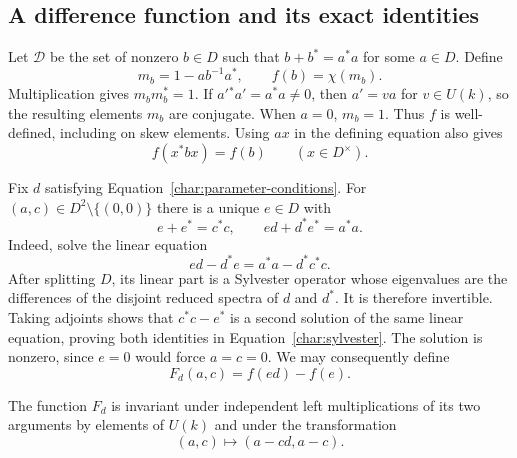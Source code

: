 \subsection{A difference function and its exact identities}

Let $\mathcal D$ be the set of nonzero $b\in D$ such that
$b+b^*=a^*a$ for some $a\in D$. Define
\begin{equation}\label{char:f}
 m_b=1-ab^{-1}a^*,\qquad f(b)=\chi(m_b).
\end{equation}
Multiplication gives $m_bm_b^*=1$. If $a'{}^*a'=a^*a\ne0$, then
$a'=va$ for $v\in U(k)$, so the resulting elements $m_b$ are conjugate.
When $a=0$, $m_b=1$. Thus $f$ is well-defined, including on skew
elements. Using $ax$ in the defining equation also gives
\begin{equation}\label{char:congruence}
 f(x^*bx)=f(b)\qquad(x\in D^\times).
\end{equation}

Fix $d$ satisfying Equation~\ref{char:parameter-conditions}.
For $(a,c)\in D^2\setminus\{(0,0)\}$ there is a unique $e\in D$ with
\begin{equation}\label{char:sylvester}
 e+e^*=c^*c,\qquad ed+d^*e^*=a^*a.
\end{equation}
Indeed, solve the linear equation
\[
 ed-d^*e=a^*a-d^*c^*c.
\]
After splitting $D$, its linear part is a Sylvester operator whose
eigenvalues are the differences of the disjoint reduced spectra of
$d$ and $d^*$. It is therefore invertible. Taking adjoints shows that
$c^*c-e^*$ is a second solution of the same linear equation, proving
both identities in Equation~\ref{char:sylvester}. The solution is
nonzero, since $e=0$ would force $a=c=0$. We may consequently define
\[
 F_d(a,c)=f(ed)-f(e).
\]

\begin{lemma}\label{char:pair-invariance}
The function $F_d$ is invariant under independent left multiplications
of its two arguments by elements of $U(k)$ and under the transformation
\begin{equation}\label{char:pair-move}
 (a,c)\longmapsto(a-cd,a-c).
\end{equation}
\end{lemma}

